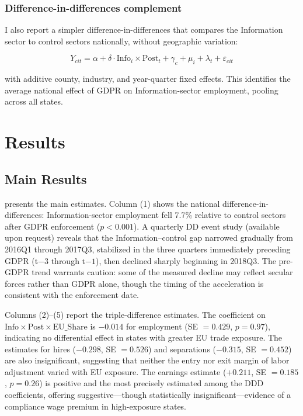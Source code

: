 \documentclass[12pt]{article}
\begin{document}
\subsubsection*{Difference-in-differences complement} I also report a simpler difference-in-differences that compares the Information sector to control sectors nationally, without geographic variation:

\begin{equation}
Y_{cit} = \alpha + \delta \cdot \text{Info}_{i} \times \text{Post}_{t} + \gamma_{c} + \mu_{i} + \lambda_{t} + \varepsilon_{cit}
\end{equation}

\noindent with additive county, industry, and year-quarter fixed effects. This identifies the average national effect of GDPR on Information-sector employment, pooling across all states.

\section{Results}

\subsection{Main Results}



 presents the main estimates. Column (1) shows the national difference-in-differences: Information-sector employment fell 7.7\% relative to control sectors after GDPR enforcement ($p < 0.001$). A quarterly DD event study (available upon request) reveals that the Information--control gap narrowed gradually from 2016Q1 through 2017Q3, stabilized in the three quarters immediately preceding GDPR (t$-3$ through t$-1$), then declined sharply beginning in 2018Q3. The pre-GDPR trend warrants caution: some of the measured decline may reflect secular forces rather than GDPR alone, though the timing of the acceleration is consistent with the enforcement date.

Columns (2)--(5) report the triple-difference estimates. The coefficient on $\text{Info} \times \text{Post} \times \text{EU\_Share}$ is $-0.014$ for employment (SE $= 0.429$, $p = 0.97$), indicating no differential effect in states with greater EU trade exposure. The estimates for hires ($-0.298$, SE $= 0.526$) and separations ($-0.315$, SE $= 0.452$) are also insignificant, suggesting that neither the entry nor exit margin of labor adjustment varied with EU exposure. The earnings estimate ($+0.211$, SE $= 0.185$, $p = 0.26$) is positive and the most precisely estimated among the DDD coefficients, offering suggestive---though statistically insignificant---evidence of a compliance wage premium in high-exposure states.
\end{document}
